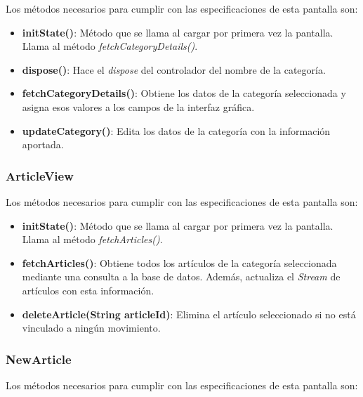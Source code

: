 Los métodos necesarios para cumplir con las especificaciones de esta pantalla son:

\begin{itemize}
	\item \textbf{initState()}: Método que se llama al cargar por primera vez la pantalla. Llama al método \textit{fetchCategoryDetails()}. 
	\item \textbf{dispose()}: Hace el \textit{dispose} del controlador del nombre de la categoría. 
	\item \textbf{fetchCategoryDetails()}: Obtiene los datos de la categoría seleccionada y asigna esos valores a los campos de la interfaz gráfica. 
	\item \textbf{updateCategory()}: Edita los datos de la categoría con la información aportada. 
\end{itemize}

\subsubsection{ArticleView}

Los métodos necesarios para cumplir con las especificaciones de esta pantalla son:

\begin{itemize}
	\item \textbf{initState()}: Método que se llama al cargar por primera vez la pantalla. Llama al método \textit{fetchArticles()}. 
	\item \textbf{fetchArticles()}: Obtiene todos los artículos de la categoría seleccionada mediante una consulta a la base de datos. Además, actualiza el \textit{Stream} de artículos con esta información. 
	\item \textbf{deleteArticle(String articleId)}: Elimina el artículo seleccionado si no está vinculado a ningún movimiento. 
\end{itemize}

\subsubsection{NewArticle}

Los métodos necesarios para cumplir con las especificaciones de esta pantalla son:


